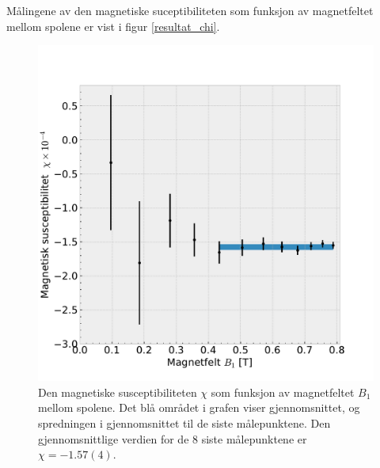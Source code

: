 \documentclass[%
 reprint,
 amsmath,amssymb,
 aps,
]{revtex4-1}
\begin{document}
Målingene av den magnetiske suceptibiliteten som funksjon av magnetfeltet mellom spolene er vist i figur \vref{resultat_chi}.
\begin{figure}[h!]
  \centering
  \includegraphics[scale=0.4]{chi_effekt.pdf}
  \caption{Den magnetiske susceptibiliteten $\chi$ som funksjon av magnetfeltet $B_1$ mellom spolene. Det blå området i grafen viser gjennomsnittet, og spredningen i gjennomsnittet til de siste målepunktene. Den gjennomsnittlige verdien for de $8$ siste målepunktene er $\chi = -1.57(4)$.}
  \label{resultat_chi}
\end{figure}
\end{document}

